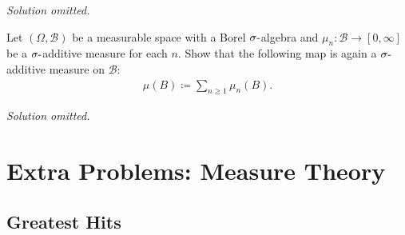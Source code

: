 \emph{Solution omitted.}

\begin{exercise}[?]

Let \((\Omega,{\mathcal{B}})\) be a measurable space with a Borel
\(\sigma{\hbox{-}}\)algebra and \(\mu_n: {\mathcal{B}}\to [0, \infty]\)
be a \(\sigma{\hbox{-}}\)additive measure for each \(n\). Show that the
following map is again a \(\sigma{\hbox{-}}\)additive measure on
\({\mathcal{B}}\):
\begin{align*}
\mu(B) \coloneqq\sum_{n\geq 1} \mu_n(B)
.\end{align*}

\end{exercise}

\emph{Solution omitted.}

\hypertarget{extra-problems-measure-theory}{%
\section{Extra Problems: Measure
Theory}\label{extra-problems-measure-theory}}

\hypertarget{greatest-hits}{%
\subsection{Greatest Hits}\label{greatest-hits}}

